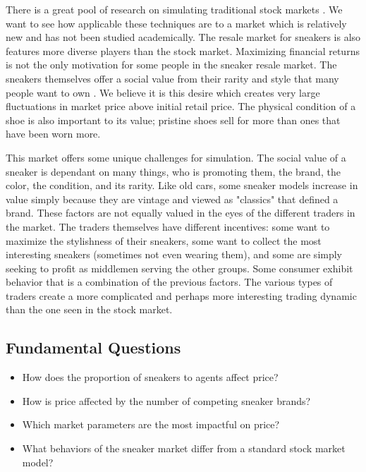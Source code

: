 \documentclass[12pt]{article}
\begin{document}
There is a great pool of research on simulating traditional stock markets \cite{Agent_Model, Stock_variation}. We want to see how applicable these techniques are to a market which is relatively new and has not been studied academically. The resale market for sneakers is also features more diverse players than the stock market. Maximizing financial returns is not the only motivation for some people in the sneaker resale market. The sneakers themselves offer a social value from their rarity and style that many people want to own \cite{538}. We believe it is this desire which creates very large fluctuations in market price above initial retail price. The physical condition of a shoe is also important to its value; pristine shoes sell for more than ones that have been worn more.

This market offers some unique challenges for simulation. The social value of a sneaker is dependant on many things, who is promoting them, the brand, the color, the condition, and its rarity. Like old cars, some sneaker models increase in value simply because they are vintage and viewed as "classics" that defined a brand. These factors are not equally valued in the eyes of the different traders in the market. The traders themselves have different incentives: some want to maximize the stylishness of their sneakers, some want to collect the most interesting sneakers (sometimes not even wearing them), and some are simply seeking to profit as middlemen serving the other groups. Some consumer exhibit behavior that is a combination of the previous factors. The various types of traders create a more complicated and perhaps more interesting trading dynamic than the one seen in the stock market.


\subsection{Fundamental Questions}
\label{FundQ}
\begin{itemize}
    \item How does the proportion of sneakers to agents affect price?
    \item How is price affected by the number of competing sneaker brands?
    \item Which market parameters are the most impactful on price?
    \item What behaviors of the sneaker market differ from a standard stock market model?
\end{itemize}
\end{document}
